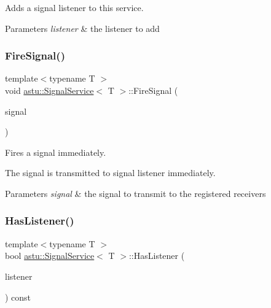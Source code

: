 Adds a signal listener to this service.


\begin{DoxyParams}{Parameters}
{\em listener} & the listener to add \\
\hline
\end{DoxyParams}
\mbox{\label{classastu_1_1SignalService_a3ead09955e8e76bbdd6d9e5a853e88af}} 
\subsubsection{\texorpdfstring{Fire\+Signal()}{FireSignal()}}
{\footnotesize\ttfamily template$<$typename T $>$ \\
void \hyperlink{classastu_1_1SignalService}{astu\+::\+Signal\+Service}$<$ T $>$\+::Fire\+Signal (\begin{DoxyParamCaption}\item[{const T \&}]{signal }\end{DoxyParamCaption})\hspace{0.3cm}{\ttfamily [inline]}}

Fires a signal immediately.

The signal is transmitted to signal listener immediately.


\begin{DoxyParams}{Parameters}
{\em signal} & the signal to transmit to the registered receivers \\
\hline
\end{DoxyParams}
\mbox{\label{classastu_1_1SignalService_acc4935715afef10b89fd905e714be389}} 
\subsubsection{\texorpdfstring{Has\+Listener()}{HasListener()}}
{\footnotesize\ttfamily template$<$typename T $>$ \\
bool \hyperlink{classastu_1_1SignalService}{astu\+::\+Signal\+Service}$<$ T $>$\+::Has\+Listener (\begin{DoxyParamCaption}\item[{const std\+::shared\+\_\+ptr$<$ \hyperlink{classastu_1_1ISignalListener}{I\+Signal\+Listener}$<$ T $>$$>$ \&}]{listener }\end{DoxyParamCaption}) const\hspace{0.3cm}{\ttfamily [inline]}}

